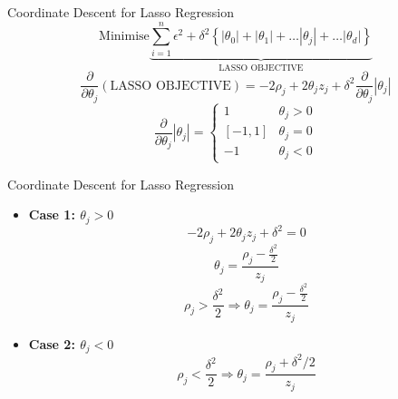 \documentclass{beamer}
\begin{document}
%




\begin{frame}{Coordinate Descent for Lasso Regression}
\[
\text{Minimise} \underbrace{\sum_{i=1}^{n} \epsilon^{2} + \delta^{2}\left\{\left|\theta_{0}\right|+\left|\theta_{1}\right|+\ldots\left|\theta_{j}\right|+\ldots |\theta_{d}|\right\}}_{\text{LASSO OBJECTIVE}}
\]
\[
\frac{\partial}{\partial \theta_{j}}(\text {LASSO OBJECTIVE})=-2 \rho_{j}+2 \theta_{j} z_{j}+\delta^{2}{\frac{\partial}{\partial \theta_{j}}}\left|\theta_{j}\right|
\]
\[
\frac{\partial}{\partial \theta_{j}}\left|\theta_{j}\right|=\left\{\begin{array}{cc}
1 & \theta_{j}>0 \\
{[-1,1]} & \theta_{j}=0 \\
-1 & \theta_{j}<0
\end{array}\right.
\]
\end{frame}

\begin{frame}{Coordinate Descent for Lasso Regression}
\begin{itemize}[<+->]
\item \textbf{Case 1: $\theta_{j}>0$}
\[
-2\rho_j+2\theta_j z_j+\delta^{2}  = 0
\]
\[
\theta_j = \frac{\rho_j - \frac{\delta^{2}}{2}}{z_{j}}
\]
\[
\rho_{j}>\frac{\delta^{2}}{2} \Rightarrow  \theta_{j} = \frac{\rho_j - \frac{\delta^{2}}{2}}{z_{j}}
\]

\item \textbf{Case 2: $\theta_{j}<0$}
\begin{equation}
\rho_{j} < \frac{\delta^{2}}{2} \Rightarrow \theta_{j} = \frac{\rho_{j}+\delta^{2} / 2}{z_{j}}
\end{equation}
\end{itemize}

\end{frame}
\end{document}
